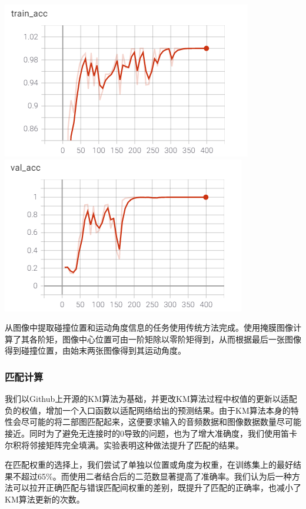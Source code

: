 \documentclass[a4paper]{ctexart}
\begin{document}
\centerline{\includegraphics[scale=0.65]{images/image_train.png}\includegraphics[scale=0.65]{images/image_val.png}}

从图像中提取碰撞位置和运动角度信息的任务使用传统方法完成。使用掩膜图像计算了其各阶矩，图像中心位置可由一阶矩除以零阶矩得到，从而根据最后一张图像得到碰撞位置，由始末两张图像得到其运动角度。

\subsubsection{匹配计算}

我们以Github上开源的KM算法\cite{KM}为基础，并更改KM算法过程中权值的更新以适配负的权值，增加一个入口函数以适配网络给出的预测结果。由于KM算法本身的特性会尽可能的将二部图匹配起来，这便要求输入的音频数据和图像数据数量尽可能接近。同时为了避免无连接时的0导致的问题，也为了增大准确度，我们使用笛卡尔积将邻接矩阵完全填满。实验表明这种做法提升了匹配的结果。

在匹配权重的选择上，我们尝试了单独以位置或角度为权重，在训练集上的最好结果不超过65\%。而使用二者结合后的二范数显著提高了准确率。我们认为后一种方法可以拉开正确匹配与错误匹配间权重的差别，既提升了匹配的正确率，也减小了KM算法更新的次数。
\end{document}
